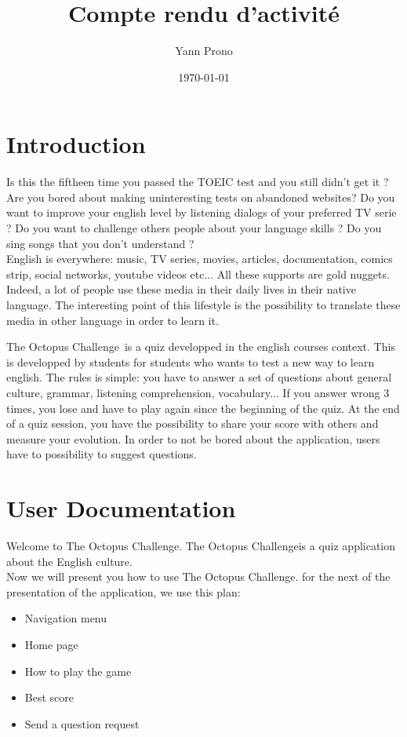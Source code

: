 \documentclass[a4paper,11pt, oneside]{book}
\title{Compte rendu d'activité}
\author{Yann Prono}
\date{\today}
\def\appName{The Octopus Challenge}
\begin{document}
	\begin{titlepage}
		
	\end{titlepage}


	\newpage

	\newpage\null\thispagestyle{empty}\newpage
	\setcounter{page}{1}
	\tableofcontents

	\chapter{Introduction}

Is this the fiftheen time you passed the TOEIC test and you still didn't get it ?
Are you bored about making uninteresting tests on abandoned websites?
Do you want to improve your english level by listening dialogs of your preferred TV serie ?
Do you want to challenge others people about your language skills ?
Do you sing songs that you don't understand ?\\

\noindent English is everywhere: music, TV series, movies, articles, documentation, comics strip, social networks, youtube videos etc...
All these supports are gold nuggets. Indeed, a lot of people use these media in their daily lives in their native language.
The interesting point of this lifestyle is the possibility to translate these media in other language in order to learn it.

\appName \ is a quiz developped in the english courses context. This is developped by students for students who wants to test a new way to learn english.
The rules is simple: you have to answer a set of questions about general culture, grammar, listening comprehension, vocabulary... If you answer wrong 3 times, you lose and have to play again since the beginning of the quiz.
At the end of a quiz session, you have the possibility to share your score with others and measure your evolution.
In order to not be bored about the application, users have to possibility to suggest questions.

\setcounter{page}{1}
	\clearpage


\chapter{User Documentation}
	Welcome to \appName.
	\appName is a quiz application about the English culture.\\
	Now we will present you how to use \appName.
	for the next of the presentation of the application, we use this plan:
	\begin{itemize}
		\item Navigation menu
		\item Home page
		\item How to play the game
		\item Best score
		\item Send a question request\\
	\end{itemize}
\end{document}
